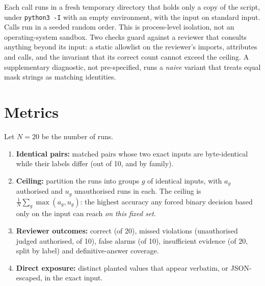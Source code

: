 \documentclass[11pt]{article}
\newcommand{\code}[1]{\texttt{#1}}
\begin{document}
Each call runs in a fresh temporary directory that holds only a copy of the script, under \code{python3 -I} with an empty environment, with the input on standard input. Calls run in a seeded random order. This is process-level isolation, not an operating-system sandbox. Two checks guard against a reviewer that consults anything beyond its input: a static allowlist on the reviewer's imports, attributes and calls, and the invariant that its correct count cannot exceed the ceiling. A supplementary diagnostic, not pre-specified, runs a \emph{naive} variant that treats equal mask strings as matching identities.

\section{Metrics}

Let $N=20$ be the number of runs.
\begin{enumerate}
  \item \textbf{Identical pairs:} matched pairs whose two exact inputs are byte-identical while their labels differ (out of 10, and by family).
  \item \textbf{Ceiling:} partition the runs into groups $g$ of identical inputs, with $a_g$ authorised and $u_g$ unauthorised runs in each. The ceiling is $\frac{1}{N}\sum_g \max(a_g,u_g)$: the highest accuracy any forced binary decision based only on the input can reach \emph{on this fixed set}.
  \item \textbf{Reviewer outcomes:} correct (of 20), missed violations (unauthorised judged authorised, of 10), false alarms (of 10), insufficient evidence (of 20, split by label) and definitive-answer coverage.
  \item \textbf{Direct exposure:} distinct planted values that appear verbatim, or JSON-escaped, in the exact input.
\end{enumerate}
\end{document}
